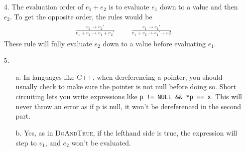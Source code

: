 \documentclass[11pt, letter]{article}
\begin{document}
\begin{itemize}
        \item[4.] The evaluation order of \(e_1+e_2\) is to evaluate \(e_1\) down to a value and
        then \(e_2\). To get the opposite order, the rules would be 
        \begin{align*}
            \begin{aligned}
                \frac{e_2\to e_2'}{e_1+e_2\to e_1+e_2'}
            \end{aligned}&&
            \begin{aligned}
                \frac{e_1\to e_1'}{e_1+v_2\to e_1'+v2}
            \end{aligned}
        \end{align*}
        These rule will fully evaluate \(e_2\) down to a value before evaluating \(e_1\).
        \item [5.]
        \begin{itemize}
            \item [a.] 
            In languages like C++, when dereferencing a pointer, you should usually check to 
            make sure the pointer is not null before doing so. Short circuiting lets
            you write expressions like \texttt{p != NULL \&\& *p == x}. This will never
            throw an error as if p is null, it won't be dereferenced in the second part.
            \item [b.] Yes, as in \textsc{DoAndTrue}, if the lefthand side is true, the 
            expression will step to \(v_1\), and \(e_2\) won't be evaluated.    
        \end{itemize}
    \end{itemize}
\end{document}
